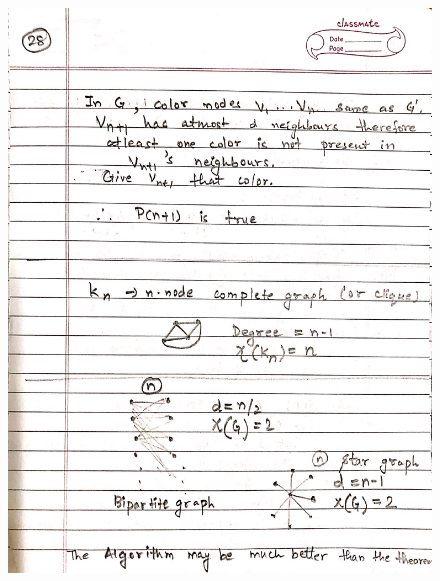 \begin{figure}[H]
    \centering
    \includegraphics[scale=0.25]{"./MIT 6.042J/MIT_6042J_028"}
\end{figure}
\newpage
